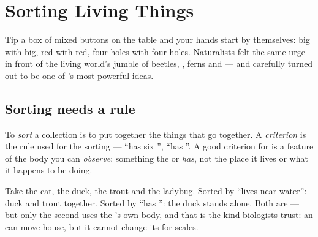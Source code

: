 \chapter{Sorting Living Things}\label{ch:g3:sorting-living-things}

Tip a box of mixed buttons on the table and your hands start
 by themselves: big with big, red with red, four holes with
four holes. Naturalists felt the same urge in front of the living
world's jumble of beetles, , ferns and  --- and 
 carefully turned out to be one of 's most
powerful ideas.

\section{Sorting needs a rule}

\begin{definition}\label{def:g3:sorting-living-things:criterion}
To \emph{sort} a collection is to put together the
things that go together. A \emph{criterion} is
the rule used for the sorting --- ``has six '', ``has
''. A good criterion for  is a feature of
the body you can \emph{observe}: something the  or 
\emph{has}, not the place it lives or what it happens to be doing.
\end{definition}

\begin{example}\label{ex:g3:sorting-living-things:two}
Take the cat, the duck, the trout and the ladybug. Sorted by
``lives near water'': duck and trout together. Sorted by ``has
'': the duck stands alone. Both are  --- but only
the second uses the 's own body, and that is the kind
biologists trust: an  can move house, but it cannot change
its  for scales.
\end{example}

